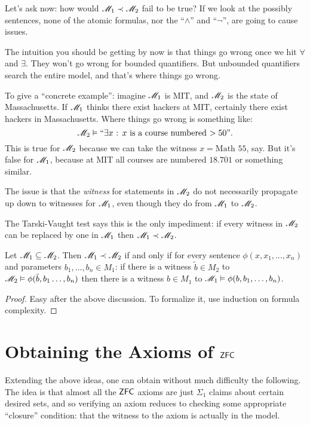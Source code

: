 Let's ask now: how would $\mathscr M_1 \prec \mathscr M_2$ fail to be true?
If we look at the possibly sentences, none of the atomic formulas,
nor the ``$\land$'' and ``$\neg$'', are going to cause issues.

The intuition you should be getting by now is that things go
wrong once we hit $\forall$ and $\exists$.
They won't go wrong for bounded quantifiers.
But unbounded quantifiers search the entire model, and that's where things go wrong.

To give a ``concrete example'':
imagine $\mathscr M_1$ is MIT, and $\mathscr M_2$ is the state of Massachusetts.
If $\mathscr M_1$ thinks there exist hackers at MIT,
certainly there exist hackers in Massachusetts.
Where things go wrong is something like:
\[ \mathscr M_2 \vDash \text{``$\exists x$ : $x$ is a course numbered $> 50$''}. \]
This is true for $\mathscr M_2$ because we can take the witness $x = \text{Math 55}$, say.
But it's false for $\mathscr M_1$, because at MIT all courses are numbered $18.701$ or something similar.
\begin{moral}
	The issue is that the \emph{witness}
	for statements in $\mathscr M_2$ do not necessarily propagate up
	down to witnesses for $\mathscr M_1$, even though they do from $\mathscr M_1$ to $\mathscr M_2$.
\end{moral}

The Tarski-Vaught test says this is the only impediment:
if every witness in $\mathscr M_2$ can be replaced by one in $\mathscr M_1$ then $\mathscr M_1 \prec \mathscr M_2$.
\begin{lemma}
	Let $\mathscr M_1 \subseteq \mathscr M_2$.
	Then $\mathscr M_1 \prec \mathscr M_2$ if and only if for
	every sentence $\phi(x, x_1, \dots, x_n)$ and parameters $b_1, \dots, b_n \in M_1$:
	if there is a witness $\tilde b \in M_2$ to $\mathscr M_2 \vDash \phi(\tilde b, b_1 \dots, b_n)$
	then there is a witness $b \in M_1$ to $\mathscr M_1 \vDash \phi(b, b_1, \dots, b_n)$.
\end{lemma}
\begin{proof}
	Easy after the above discussion.
	To formalize it, use induction on formula complexity.
\end{proof}

\section{Obtaining the Axioms of $\mathsf{ZFC}$}
Extending the above ideas, one can obtain without much difficulty the following.
The idea is that almost all the $\mathsf{ZFC}$ axioms are just $\Sigma_1$ claims about certain desired sets,
and so verifying an axiom reduces to checking some appropriate ``closure'' condition:
that the witness to the axiom is actually in the model.

